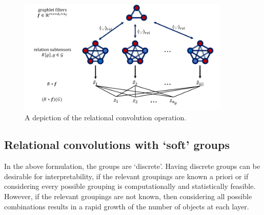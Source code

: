 \begin{figure}[!ht]
    \vskip-10pt
    \centering
    \includegraphics[width=0.9\textwidth]{figs/relconv_diagram2.pdf}
    \vskip-10pt
    \caption{A depiction of the relational convolution operation.
    }\label{fig:relconvdiagram}
    \vskip -10pt
\end{figure}

\subsection{Relational convolutions with `soft' groups}

In the above formulation, the groups are `discrete'. Having discrete groups can be desirable for interpretability, if the relevant groupings are known a priori or if considering every possible grouping is computationally and statistically feasible. However, if the relevant groupings are not known, then considering all possible combinations results in a rapid growth of the number of objects at each layer.


